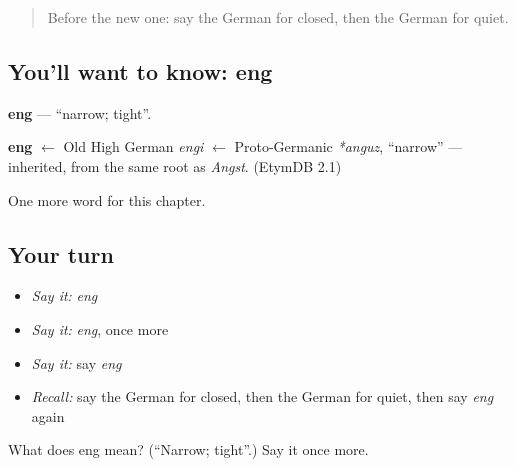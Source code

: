 \label{lesson:GE-C131-eng}



\begin{quote}
Before the new one: say the German for closed, then the German for quiet.
\end{quote}

\subsection*{You'll want to know: eng}
\textbf{eng} — \textquotedblleft{}narrow; tight\textquotedblright{}.

\begin{cousinweb}
\textbf{eng} $\leftarrow$ Old High German \emph{engi} $\leftarrow$ Proto-Germanic \emph{*anguz}, \textquotedblleft{}narrow\textquotedblright{} — inherited, from the same root as \emph{Angst}. (EtymDB 2.1)
\end{cousinweb}

\begin{grammarlens}[title={What you've built}]
One more word for this chapter.
\end{grammarlens}

\subsection*{Your turn}
\begin{itemize}
\raggedright
  \item \emph{Say it:} \emph{eng}
  \item \emph{Say it:} \emph{eng}, once more
  \item \emph{Say it:} say \emph{eng}
  \item \emph{Recall:} say the German for closed, then the German for quiet, then say \emph{eng} again
\end{itemize}

\begin{tcolorbox}[breakable,colback=teal!4,colframe=teal!35!black,title={Before you move on}]
What does eng mean? (\textquotedblleft{}Narrow; tight\textquotedblright{}.) Say it once more.
\end{tcolorbox}
